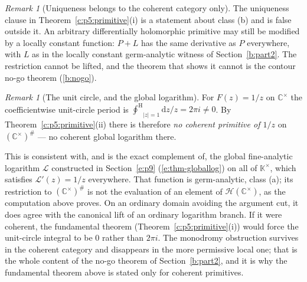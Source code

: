 \documentclass[11pt,a4paper]{article}
\numberwithin{equation}{section}
\theoremstyle{definition}
\theoremstyle{remark}
\newtheorem{remark}[theorem]{Remark}
\theoremstyle{plain}
\newcommand{\K}{\mathbb K}
\newcommand{\CC}{\mathbb C}
\newcommand{\halo}[1]{#1^{\#}}
\newcommand{\Hc}{\mathcal H}
\newcommand{\ointH}{{\oint^{\mathrm H}}}
\newcommand{\abs}[1]{\lvert #1\rvert}
\newcommand{\dd}{\mathrm d}
\begin{document}
\begin{remark}[Uniqueness belongs to the coherent category only]
\label{c:p5:rk-uniqueness}
The uniqueness clause in Theorem~\ref{c:p5:primitive}(i) is a statement
about class (b) and is false outside it. An arbitrary differentially
holomorphic primitive may still be modified by a locally constant
function: $P+L$ has the same derivative as $P$ everywhere, with $L$ as in
the locally constant germ-analytic witness of Section~\ref{b:part2}. The restriction cannot be lifted, and the theorem
that shows it cannot is the contour no-go theorem
(\ref{b:nogo}).
\end{remark}

\begin{remark}[The unit circle, and the global logarithm]
\label{c:p5:rk-logarithm}
For $F(z)=1/z$ on $\CC^{\times}$ the coefficientwise unit-circle period
is $\ointH_{\abs z=1}\dd z/z=2\pi i\ne0$. By
Theorem~\ref{c:p5:primitive}(ii) there is therefore \emph{no coherent
primitive of $1/z$} on $\halo{(\CC^{\times})}$ --- no coherent global
logarithm there.

This is consistent with, and is the exact complement of, the global
fine-analytic logarithm $\mathcal L$ constructed in Section~\ref{e:p9}
(\ref{e:thm-globallog}) on all of $\K^{\times}$, which satisfies
$\mathcal L'(z)=1/z$ everywhere. That function is germ-analytic, class
(a); its restriction to $\halo{(\CC^\times)}$ is not the evaluation
of an element of $\Hc(\CC^\times)$, as the computation above proves.
On an ordinary domain avoiding the argument cut, it does agree with
the canonical lift of an ordinary logarithm branch. If it were coherent, the fundamental theorem
(Theorem~\ref{c:p5:primitive}(i)) would force the unit-circle integral to
be $0$ rather than $2\pi i$. The monodromy obstruction survives in the
coherent category and disappears in the more permissive local one; that
is the whole content of the no-go theorem of Section~\ref{b:part2}, and it is
why the fundamental theorem above is stated only for coherent
primitives.
\end{remark}


\end{document}
